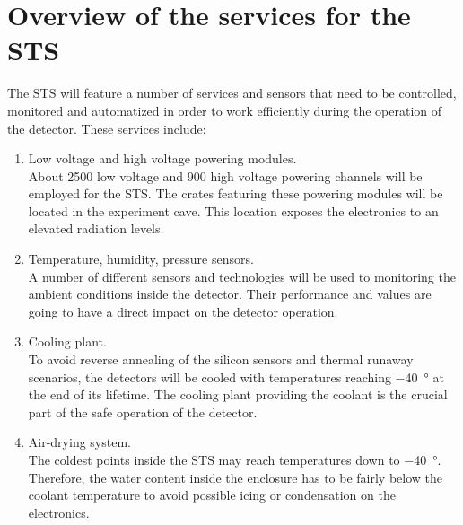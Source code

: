 \section{Overview of the services for the STS}

The \gls{STS} will feature a number of services and sensors that need to be controlled, monitored and automatized in order to work efficiently during the operation of the detector. These services include:
\begin{enumerate}
    \item Low voltage and high voltage powering modules.\\
    About 2500 low voltage and 900 high voltage powering channels will be employed for the \gls{STS}. The crates featuring these powering modules will be located in the experiment cave. This location exposes the electronics to an elevated radiation levels. 
    \item Temperature, humidity, pressure sensors.\\
    A number of different sensors and technologies will be used to monitoring the ambient conditions inside the detector. Their performance and values are going to have a direct impact on the detector operation.
    \item Cooling plant.\\
    To avoid reverse annealing of the silicon sensors and thermal runaway scenarios, the detectors will be cooled with temperatures reaching \SI{-40}{\degree} at the end of its lifetime. The cooling plant providing the coolant is the crucial part of the safe operation of the detector.
    \item Air-drying system.\\
    The coldest points inside the \gls{STS} may reach temperatures down to \SI{-40}{\degree}. Therefore, the water content inside the enclosure has to be fairly below the coolant temperature to avoid possible icing or condensation on the electronics.
 \end{enumerate}



